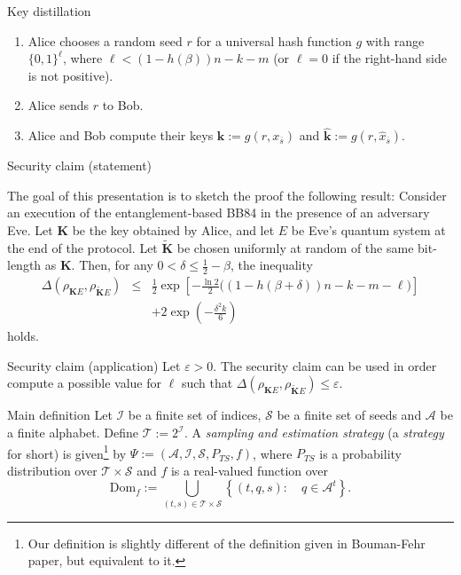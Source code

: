 \documentclass{beamer}
\begin{document}
\begin{frame}{Key distillation}
\begin{enumerate}[label=(\roman*)]
\item Alice chooses a random seed $r$ for a universal hash function $g$ with range $\{0,1\}^{\ell}$, where $\ell < \left(1 - h(\beta)\right) n - k - m$ (or $\ell = 0$ if the right-hand side is not positive).
\item Alice sends $r$ to Bob.
\item Alice and Bob compute their keys $\mathbf{k} := g(r, x_{\overline{s}})$ and $\mathbf{\hat{k}} := g(r, \hat{x}_{\overline{s}})$.
\end{enumerate}
\end{frame}

\begin{frame}{Security claim (statement)}

The goal of this presentation is to sketch the proof the following result: Consider an execution of the entanglement-based BB84 in the presence of an adversary Eve. Let $\mathbf{K}$ be the key obtained by Alice, and let $E$ be Eve's quantum system at the end of the protocol. Let $\mathbf{\tilde{K}}$ be chosen uniformly at random of the same bit-length as $\mathbf{K}$. Then, for any $0 < \delta \leq \frac{1}{2}-\beta$, the inequality
\begin{eqnarray*}
\Delta\left( \rho_{\mathbf{K}E}, \rho_{\mathbf{\tilde{K}}E} \right) &\leq& \frac{1}{2}  \exp\left[ -\frac{\ln 2}{2} \bigg( (1 - h(\beta+\delta))n - k - m - \ell \bigg) \right] \\
& & + 2\exp\left( -\frac{\delta^2 k}{6} \right)
\end{eqnarray*}
holds.

\end{frame}

\begin{frame}{Security claim (application)}
Let  $\varepsilon > 0$. The security claim can be used in order compute a possible value for $\ell$ such that $\Delta\left( \rho_{\mathbf{K}E}, \rho_{\mathbf{\tilde{K}}E} \right) \leq \varepsilon$.
\end{frame}

\begin{frame}{Main definition}
Let $\mathcal{I}$ be a finite set of indices, $\mathcal{S}$ be a finite set of seeds and $\mathcal{A}$ be a finite alphabet. Define $\mathcal{T} := 2^{\mathcal{I}}$. A \emph{sampling and estimation strategy} (a \emph{strategy} for short) is given\footnote{Our definition is slightly different of the definition given in Bouman-Fehr paper, but equivalent to it.} by $\Psi := \left(\mathcal{A}, \mathcal{I}, \mathcal{S}, P_{TS}, f \right)$, where $P_{TS}$ is a probability distribution over $\mathcal{T} \times \mathcal{S}$ and $f$ is a real-valued function over 
$$
\text{Dom}_f := \bigcup_{(t, s)\in\mathcal{T}\times\mathcal{S}} \left\{ (t, q, s): \quad q \in \mathcal{A}^t \right\}.
$$
\end{frame}
\end{document}
